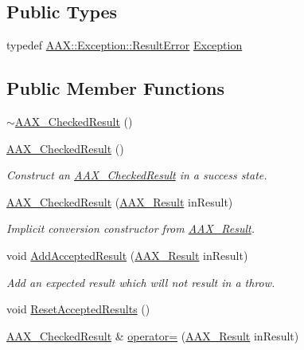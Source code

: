  \subsection*{Public Types}
\begin{DoxyCompactItemize}
\item 
typedef \hyperlink{a00147}{A\+A\+X\+::\+Exception\+::\+Result\+Error} \hyperlink{a00019_a36fd71afc6d62993c1dd96e1ca9fcc0e}{Exception}
\end{DoxyCompactItemize}
\subsection*{Public Member Functions}
\begin{DoxyCompactItemize}
\item 
\hyperlink{a00019_ac8120ba01d2f25608d74533c9d1a9747}{$\sim$\+A\+A\+X\+\_\+\+Checked\+Result} ()
\item 
\hyperlink{a00019_aab8a1c36b9be4f6aac93d79d3160dde8}{A\+A\+X\+\_\+\+Checked\+Result} ()
\begin{DoxyCompactList}\small\item\em Construct an \hyperlink{a00019}{A\+A\+X\+\_\+\+Checked\+Result} in a success state. \end{DoxyCompactList}\item 
\hyperlink{a00019_a03a1d64b0bf359b6a23ae59f6d892859}{A\+A\+X\+\_\+\+Checked\+Result} (\hyperlink{a00149_a4d8f69a697df7f70c3a8e9b8ee130d2f}{A\+A\+X\+\_\+\+Result} in\+Result)
\begin{DoxyCompactList}\small\item\em Implicit conversion constructor from \hyperlink{a00149_a4d8f69a697df7f70c3a8e9b8ee130d2f}{A\+A\+X\+\_\+\+Result}. \end{DoxyCompactList}\item 
void \hyperlink{a00019_af6c4b10c55e959f5f8424514a3cbb68a}{Add\+Accepted\+Result} (\hyperlink{a00149_a4d8f69a697df7f70c3a8e9b8ee130d2f}{A\+A\+X\+\_\+\+Result} in\+Result)
\begin{DoxyCompactList}\small\item\em Add an expected result which will not result in a throw. \end{DoxyCompactList}\item 
void \hyperlink{a00019_a14a7d7cab3e771a38481a7ab5447ea52}{Reset\+Accepted\+Results} ()
\item 
\hyperlink{a00019}{A\+A\+X\+\_\+\+Checked\+Result} \& \hyperlink{a00019_af95bea6f011d9a779170fc6128dc7295}{operator=} (\hyperlink{a00149_a4d8f69a697df7f70c3a8e9b8ee130d2f}{A\+A\+X\+\_\+\+Result} in\+Result)

\end{DoxyCompactItemize}

